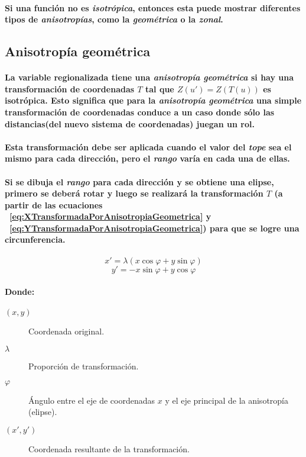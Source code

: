 \paragraph{
Si una función no es \emph{isotrópica}, entonces esta puede mostrar diferentes tipos de \emph{anisotropías}, como la \emph{geométrica} o la \emph{zonal}.
}


\subsection{Anisotropía geométrica}
\paragraph*{
La variable regionalizada tiene una \emph{anisotropía geométrica} si hay una transformación de coordenadas $T$ tal que $Z(u') = Z(T(u))$ es isotrópica. Esto significa que para la \emph{anisotropía geométrica} una simple transformación de coordenadas conduce a un caso donde sólo las distancias\footnotemark[20] (del nuevo sistema de coordenadas) juegan un rol.
}
\paragraph{
Esta transformación debe ser aplicada cuando el valor del \emph{tope} sea el mismo para cada dirección, pero el \emph{rango} varía en cada una de ellas.
}
\paragraph*{
Si se dibuja el \emph{rango} para cada dirección y se obtiene una elipse\footnotemark[21], primero se deberá rotar y luego se realizará la transformación $T$ (a partir de las ecuaciones ~\ref{eq:XTransformadaPorAnisotropiaGeometrica} y ~\ref{eq:YTransformadaPorAnisotropiaGeometrica}) para que se logre una circunferencia. 
}
\begin{equation}
\label{eq:XTransformadaPorAnisotropiaGeometrica}
x'=\lambda(x \cos \varphi + y \sin \varphi)
\end{equation}
\begin{equation}
\label{eq:YTransformadaPorAnisotropiaGeometrica}
y'= -x \sin \varphi + y \cos \varphi
\end{equation}
\paragraph{
Donde:
}
\begin{description}
\item[$(x,y)$] Coordenada original.
\item[$\lambda$] Proporción de transformación.
\item[$\varphi$] Ángulo entre el eje de coordenadas $x$ y el eje principal de la anisotropía (elipse).
\item[$(x',y')$] Coordenada resultante de la transformación.
\end{description}
